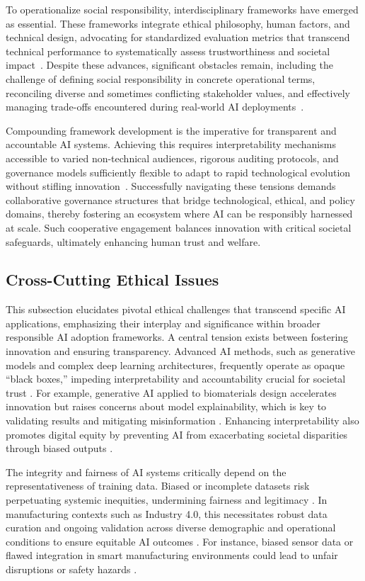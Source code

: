 \documentclass[sigconf]{acmart}
\begin{document}
To operationalize social responsibility, interdisciplinary frameworks have emerged as essential. These frameworks integrate ethical philosophy, human factors, and technical design, advocating for standardized evaluation metrics that transcend technical performance to systematically assess trustworthiness and societal impact~\cite{ref26}. Despite these advances, significant obstacles remain, including the challenge of defining social responsibility in concrete operational terms, reconciling diverse and sometimes conflicting stakeholder values, and effectively managing trade-offs encountered during real-world AI deployments~\cite{ref26}.

Compounding framework development is the imperative for transparent and accountable AI systems. Achieving this requires interpretability mechanisms accessible to varied non-technical audiences, rigorous auditing protocols, and governance models sufficiently flexible to adapt to rapid technological evolution without stifling innovation~\cite{ref26}. Successfully navigating these tensions demands collaborative governance structures that bridge technological, ethical, and policy domains, thereby fostering an ecosystem where AI can be responsibly harnessed at scale. Such cooperative engagement balances innovation with critical societal safeguards, ultimately enhancing human trust and welfare.

\subsection{Cross-Cutting Ethical Issues}

This subsection elucidates pivotal ethical challenges that transcend specific AI applications, emphasizing their interplay and significance within broader responsible AI adoption frameworks. A central tension exists between fostering innovation and ensuring transparency. Advanced AI methods, such as generative models and complex deep learning architectures, frequently operate as opaque “black boxes,” impeding interpretability and accountability crucial for societal trust \cite{ref7,ref8}. For example, generative AI applied to biomaterials design accelerates innovation but raises concerns about model explainability, which is key to validating results and mitigating misinformation \cite{ref7}. Enhancing interpretability also promotes digital equity by preventing AI from exacerbating societal disparities through biased outputs \cite{ref6,ref17}.

The integrity and fairness of AI systems critically depend on the representativeness of training data. Biased or incomplete datasets risk perpetuating systemic inequities, undermining fairness and legitimacy \cite{ref37}. In manufacturing contexts such as Industry 4.0, this necessitates robust data curation and ongoing validation across diverse demographic and operational conditions to ensure equitable AI outcomes \cite{ref20}. For instance, biased sensor data or flawed integration in smart manufacturing environments could lead to unfair disruptions or safety hazards \cite{ref38}.
\end{document}

